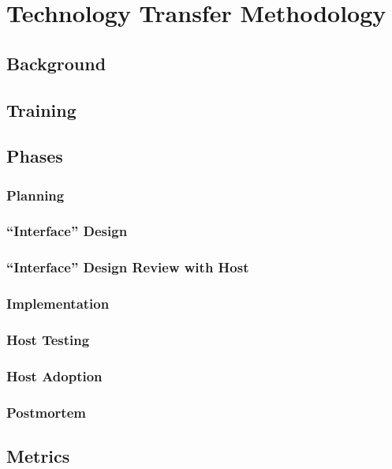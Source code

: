 
\section{Technology Transfer Methodology}
\label{sec:method}
\subsection{Background}
\subsection{Training}
\subsection{Phases}
\subsubsection{Planning}
\subsubsection{``Interface'' Design}
\subsubsection{``Interface'' Design Review with Host}
\subsubsection{Implementation}
\subsubsection{Host Testing}
\subsubsection{Host Adoption}
\subsubsection{Postmortem}
\subsection{Metrics}